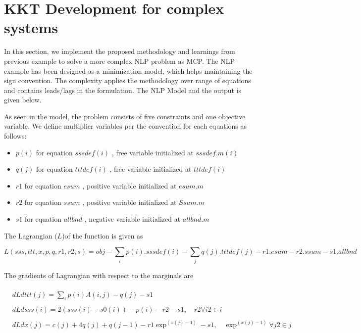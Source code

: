\documentclass{article}
\begin{document}
\section{KKT Development for complex systems}

In this section, we implement the proposed methodology and learnings from previous example to solve a more complex NLP problem as MCP. The NLP example has been designed as a minimization model, which helps maintaining the sign convention. The complexity applies the methodology over range of equations and contains leads/lags in the formulation. The NLP Model and the output is given below.






As seen in the model, the problem consists of five constraints and one objective variable. We define multiplier variables per the convention for each equations as follows:
\renewcommand\labelitemi{\tiny$\bullet$}
\begin{itemize} 
	\item $p(i)$ for equation $sssdef(i)$ , free variable initialized at $sssdef.m(i)$
	\item $q(j)$ for equation $tttdef(i)$    , free variable initialized at $tttdef(i)$ 
	\item $r1$ for equation $esum$		, positive variable initialized at $esum.m$	
	\item $r2$ for equation $ssum$		, positive variable  initialized at $Ssum.m$	
	\item $s1$ for equation $allbnd$	, negative variable initialized at $allbnd.m$	
\end{itemize}

The Lagrangian ($L$)of the function is given as 

\begin{equation}
	L (sss,ttt,x,p,q,r1,r2,s) = obj - \sum_{i} p(i) . sssdef(i) -  \sum_{j} q(j) . tttdef(j) - r1 . esum - r2 . ssum - s1 . allbnd
\end{equation}

The gradients of Lagrangian with respect to the marginals are 

\begin{equation}
\begin{aligned}
\\
& dLdttt(j) =  \sum_{i} p(i)A(i,j) -  q(j)  - s1 \\
\\
& dLdsss(i) = 2(sss(i) - s0(i)) - p(i)  -  r2 -  s1  , \quad r2  \forall i2 \in i \\
\\
& dLdx(j) = c(j) + 4q(j) + q(j-1) - r1 \exp^{(x(j)-1)} - s1 ,   \quad  \exp^{(x(j)-1)}  \forall j2 \in j \\
\\
\end{aligned}
\end{equation}
\end{document}
